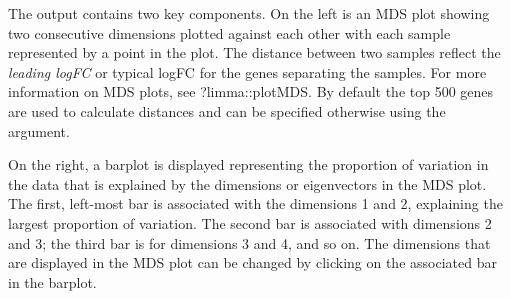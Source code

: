 \documentclass{article}
\newcommand{\Rarg}[1]{\textcolor{BlueGreen}{{\sf{#1}}}}
\begin{document}
The output contains two key components. On the left is an MDS plot showing two consecutive dimensions plotted against each other with each sample represented by a point in the plot. The distance between two samples reflect the {\it leading logFC} or typical logFC for the genes separating the samples. For more information on MDS plots, see {\sf ?limma::plotMDS}. By default the top 500 genes are used to calculate distances and can be specified otherwise using the \Rarg{top} argument.

On the right, a barplot is displayed representing the proportion of variation in the data that is explained by the dimensions or eigenvectors in the MDS plot. The first, left-most bar is associated with the dimensions 1 and 2, explaining the largest proportion of variation. The second bar is associated with dimensions 2 and 3; the third bar is for dimensions 3 and 4, and so on. The dimensions that are displayed in the MDS plot can be changed by clicking on the associated bar in the barplot.
\end{document}
